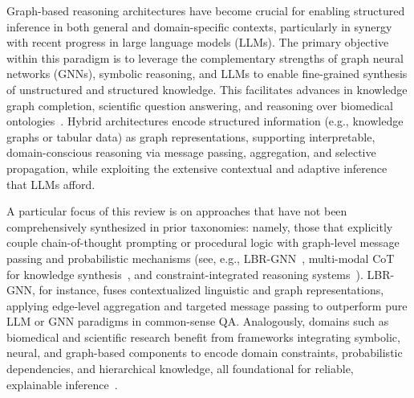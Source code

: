 \documentclass[sigconf]{acmart}
\begin{document}
Graph-based reasoning architectures have become crucial for enabling structured inference in both general and domain-specific contexts, particularly in synergy with recent progress in large language models (LLMs). The primary objective within this paradigm is to leverage the complementary strengths of graph neural networks (GNNs), symbolic reasoning, and LLMs to enable fine-grained synthesis of unstructured and structured knowledge. This facilitates advances in knowledge graph completion, scientific question answering, and reasoning over biomedical ontologies~\cite{ref87,ref88,ref31,ref36,ref46,ref47,ref48,ref49,ref50,ref55,ref60,ref74,ref75,ref80}. Hybrid architectures encode structured information (e.g., knowledge graphs or tabular data) as graph representations, supporting interpretable, domain-conscious reasoning via message passing, aggregation, and selective propagation, while exploiting the extensive contextual and adaptive inference that LLMs afford.

A particular focus of this review is on approaches that have not been comprehensively synthesized in prior taxonomies: namely, those that explicitly couple chain-of-thought prompting or procedural logic with graph-level message passing and probabilistic mechanisms (see, e.g., LBR-GNN~\cite{ref87}, multi-modal CoT for knowledge synthesis~\cite{ref88}, and constraint-integrated reasoning systems~\cite{ref89,ref49}). LBR-GNN, for instance, fuses contextualized linguistic and graph representations, applying edge-level aggregation and targeted message passing to outperform pure LLM or GNN paradigms in common-sense QA. Analogously, domains such as biomedical and scientific research benefit from frameworks integrating symbolic, neural, and graph-based components to encode domain constraints, probabilistic dependencies, and hierarchical knowledge, all foundational for reliable, explainable inference~\cite{ref31,ref36,ref46,ref47,ref48,ref49,ref50,ref55,ref60,ref74,ref75,ref80,ref87,ref88}.
\end{document}
